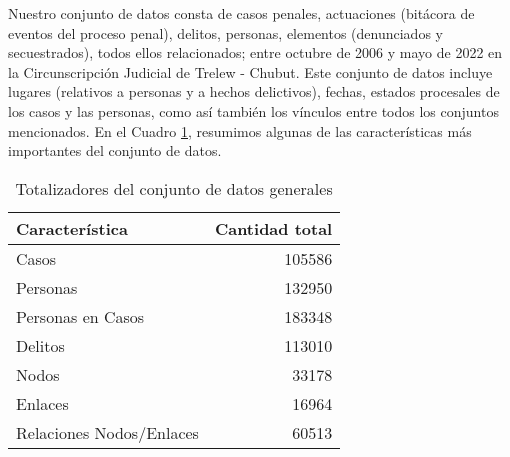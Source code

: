 Nuestro conjunto de datos consta de casos penales, actuaciones (bitácora de eventos del proceso penal), delitos, personas, elementos (denunciados y secuestrados), todos ellos relacionados; entre octubre de 2006 y mayo de 2022 en la Circunscripción Judicial de Trelew - Chubut. Este conjunto de datos incluye lugares (relativos a personas y a hechos delictivos), fechas, estados procesales de los casos y las personas, como así también los vínculos entre todos los conjuntos mencionados. En el Cuadro \ref{tab:TotalizadoresGenerales}, resumimos algunas de las características más importantes del conjunto de datos.
\vspace{-10pt}
\begin{table}
	\centering
	\label{tab:TotalizadoresGenerales}
	\begin{tabular}{|l|r|}
		\hline
		\textbf{Característica} &  \textbf{Cantidad total} \\
		\hline
		Casos &  105586 \\
		\hline
		Personas &  132950 \\
		\hline
		Personas en Casos &  183348 \\
		\hline
		Delitos &  113010 \\
		\hline
		Nodos &  33178 \\
		\hline
		Enlaces &  16964 \\
		\hline
		Relaciones Nodos/Enlaces &  60513 \\
		\hline
	\end{tabular}
	\vspace{10pt}
	\caption{Totalizadores del conjunto de datos generales}
\end{table}
\vspace{-10pt}
